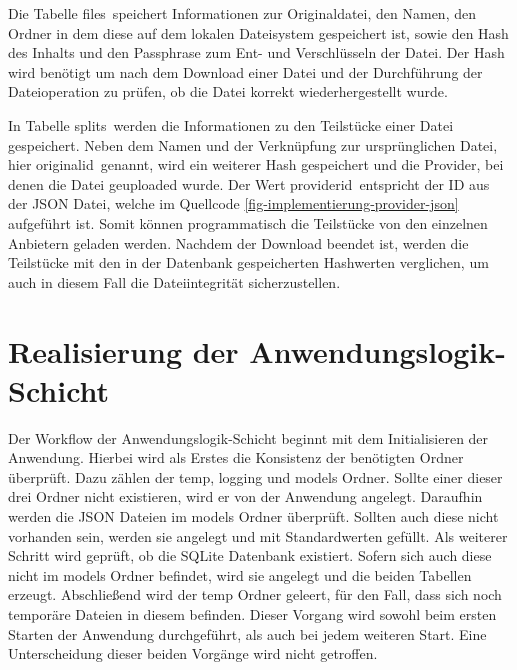 Die Tabelle \frqq files\flqq\ speichert Informationen zur Originaldatei, den Namen, den Ordner in dem diese auf dem lokalen Dateisystem gespeichert ist, sowie den Hash des Inhalts und den Passphrase zum Ent- und Verschlüsseln der Datei.
Der Hash wird benötigt um nach dem Download einer Datei und der Durchführung der Dateioperation zu prüfen, ob die Datei korrekt wiederhergestellt wurde.

In Tabelle \frqq splits\flqq\ werden die Informationen zu den Teilstücke einer Datei gespeichert.
Neben dem Namen und der Verknüpfung zur ursprünglichen Datei, hier \frqq originalid\flqq\ genannt, wird ein weiterer Hash gespeichert und die Provider, bei denen die Datei geuploaded wurde.
Der Wert \frqq providerid\flqq\ entspricht der ID aus der \ac{JSON} Datei, welche im Quellcode \ref{fig-implementierung-provider-json} aufgeführt ist.
Somit können programmatisch die Teilstücke von den einzelnen Anbietern geladen werden.
Nachdem der Download beendet ist, werden die Teilstücke mit den in der Datenbank gespeicherten Hashwerten verglichen, um auch in diesem Fall die Dateiintegrität sicherzustellen.

\section{Realisierung der Anwendungslogik-Schicht}
\label{implementierung-realisierung-anwendungslogik}
Der Workflow der Anwendungslogik-Schicht beginnt mit dem Initialisieren der Anwendung.
Hierbei wird als Erstes die Konsistenz der benötigten Ordner überprüft.
Dazu zählen der temp, logging und models Ordner.
Sollte einer dieser drei Ordner nicht existieren, wird er von der Anwendung angelegt.
Daraufhin werden die \ac{JSON} Dateien im models Ordner überprüft.
Sollten auch diese nicht vorhanden sein, werden sie angelegt und mit Standardwerten gefüllt.
Als weiterer Schritt wird geprüft, ob die SQLite Datenbank existiert.
Sofern sich auch diese nicht im models Ordner befindet, wird sie angelegt und die beiden Tabellen erzeugt.
Abschließend wird der temp Ordner geleert, für den Fall, dass sich noch temporäre Dateien in diesem befinden.
Dieser Vorgang wird sowohl beim ersten Starten der Anwendung durchgeführt, als auch bei jedem weiteren Start.
Eine Unterscheidung dieser beiden Vorgänge wird nicht getroffen.

